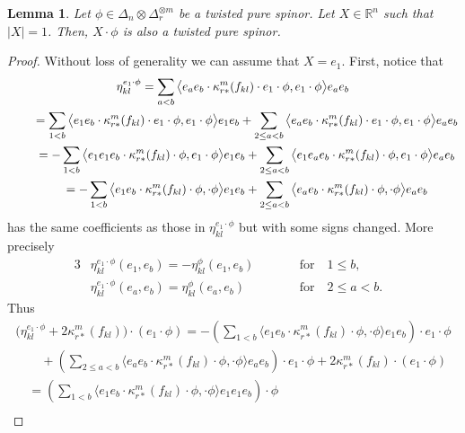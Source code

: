\documentclass[pdftex]{sigma}
\numberwithin{equation}{section}
\newtheorem{Lemma}[Theorem]{Lemma}
\begin{document}
\begin{Lemma}\label{lemma: producing more pure spinors} Let $\phi\in\Delta_n\otimes\Delta_r^{\otimes m}$ be a twisted pure spinor. Let $X\in\mathbb{R}^n$ such that $|X|=1$. Then, $X\cdot\phi$ is also a twisted pure spinor.
\end{Lemma}
\begin{proof}\allowdisplaybreaks Without loss of generality we can assume that $X=e_1$. First, notice that
\begin{gather*}
\eta_{kl}^{e_1\cdot\phi}
 = \sum_{a<b} \big\langle e_ae_b\cdot\kappa_{r*}^m(f_{kl})\cdot e_1\cdot\phi,e_1\cdot\phi\big\rangle e_ae_b\\
 \hphantom{\eta_{kl}^{e_1\cdot\phi}}{} = \sum_{1<b} \big\langle e_1e_b\cdot\kappa_{r*}^m(f_{kl})\cdot e_1\cdot\phi,e_1\cdot\phi\big\rangle e_1e_b
 +\sum_{2\leq a<b} \big\langle e_ae_b\cdot\kappa_{r*}^m(f_{kl})\cdot e_1\cdot\phi,e_1\cdot\phi\big\rangle e_ae_b\\
 \hphantom{\eta_{kl}^{e_1\cdot\phi}}{}= -\sum_{1<b} \big\langle e_1e_1e_b\cdot\kappa_{r*}^m(f_{kl})\cdot\phi,e_1\cdot\phi\big\rangle e_1e_b
 +\sum_{2\leq a<b} \big\langle e_1e_ae_b\cdot\kappa_{r*}^m(f_{kl})\cdot\phi,e_1\cdot\phi\big\rangle e_ae_b\\
 \hphantom{\eta_{kl}^{e_1\cdot\phi}}{} = -\sum_{1<b} \big\langle e_1e_b\cdot\kappa_{r*}^m(f_{kl})\cdot\phi,\cdot\phi\big\rangle e_1e_b
 +\sum_{2\leq a<b} \big\langle e_ae_b\cdot\kappa_{r*}^m(f_{kl})\cdot\phi,\cdot\phi\big\rangle e_ae_b
\end{gather*}
has the same coefficients as those in $\eta_{kl}^{e_1\cdot\phi}$ but with some signs changed. More precisely
\begin{alignat*}{3}
&\eta_{kl}^{e_1\cdot\phi}(e_1,e_b) = -\eta_{kl}^{\phi}(e_1,e_b)\qquad&&\text{for} \quad 1\leq b,&\\
& \eta_{kl}^{e_1\cdot\phi}(e_a,e_b) = \eta_{kl}^{\phi}(e_a,e_b)\qquad&& \text{for} \quad 2\leq a<b.&
\end{alignat*}
Thus
\begin{gather*}
\big(\eta_{kl}^{e_1\cdot\phi}+2\kappa_{r*}^m(f_{kl})\big)\cdot (e_1\cdot\phi)
 = -\left(\sum_{1<b} \big\langle e_1e_b\cdot\kappa_{r*}^m(f_{kl})\cdot\phi,\cdot\phi\big\rangle e_1e_b\right)\cdot e_1\cdot\phi\\
 \qquad{} +\left(\sum_{2\leq a<b} \big\langle e_ae_b\cdot\kappa_{r*}^m(f_{kl})\cdot\phi,\cdot\phi\big\rangle e_ae_b\right)\cdot e_1\cdot\phi
 + 2\kappa_{r*}^m(f_{kl})\cdot (e_1\cdot\phi)\\
 \quad{} = \left(\sum_{1<b} \big\langle e_1e_b\cdot\kappa_{r*}^m(f_{kl})\cdot\phi,\cdot\phi\big\rangle e_1e_1e_b\right)\cdot\phi\\

\end{gather*}
\end{proof}
\end{document}
